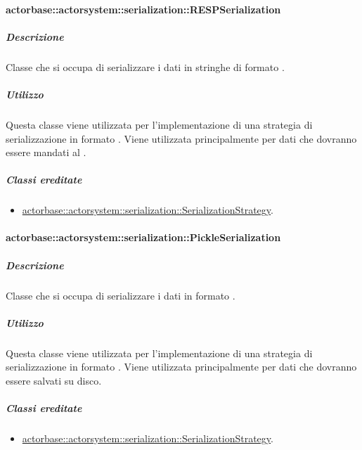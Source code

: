 \documentclass{scalatekids-article}
\begin{document}
\paragraph{actorbase::actorsystem::serialization::RESPSerialization}
\label{sec:actorbase::actorsystem::serialization::RESPSerialization}

\subparagraph{Descrizione}

Classe che si occupa di serializzare i dati in stringhe di formato .

\subparagraph{Utilizzo}

Questa classe viene utilizzata per l'implementazione di una strategia di
serializzazione in formato . Viene utilizzata principalmente per
dati che dovranno essere mandati al .

\subparagraph{Classi ereditate}

\begin{itemize}

\item \hyperref[sec:actorbase::actorsystem::serialization::SerializationStrategy]{actorbase::actorsystem::serialization::SerializationStrategy}.

\end{itemize}

\paragraph{actorbase::actorsystem::serialization::PickleSerialization}
\label{sec:actorbase::actorsystem::serialization::PickleSerialization}

\subparagraph{Descrizione}

Classe che si occupa di serializzare i dati in formato .

\subparagraph{Utilizzo}

Questa classe viene utilizzata per l'implementazione di una strategia di
serializzazione in formato . Viene utilizzata principalmente per
dati che dovranno essere salvati su disco.

\subparagraph{Classi ereditate}

\begin{itemize}

\item \hyperref[sec:actorbase::actorsystem::serialization::SerializationStrategy]{actorbase::actorsystem::serialization::SerializationStrategy}.

\end{itemize}
\end{document}
